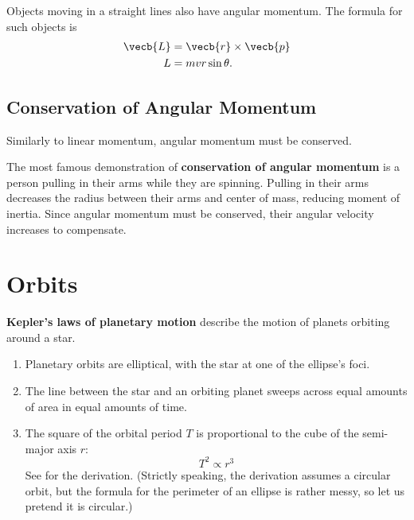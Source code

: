 Objects moving in a straight lines also have angular momentum.
The formula for such objects is
\begin{subequations}
    \begin{align}
        \vecb{L} &= \vecb{r} \times \vecb{p} \\
        L &= m v r \sin\theta. \label{eq:angular-momentum-linear-velocity}
    \end{align}
\end{subequations}

\subsection{Conservation of Angular Momentum}

Similarly to linear momentum, angular momentum must be conserved.

The most famous demonstration of \textbf{conservation of angular momentum}
is a person pulling in their arms while they are spinning.
Pulling in their arms decreases the radius between their arms and
center of mass,
reducing moment of inertia.
Since angular momentum must be conserved,
their angular velocity increases to compensate.

\section{Orbits} \label{sec:orbits}

\textbf{Kepler's laws of planetary motion}
describe the motion of planets orbiting around a star.
\begin{enumerate}
    \item Planetary orbits are elliptical,
        with the star at one of the ellipse's foci.
    \item \label{itm:keplers-2nd-law}
        The line between the star and an orbiting planet
        sweeps across equal amounts of area in equal amounts of time.
    \item The square of the orbital period \(T\) is proportional to
        the cube of the semi-major axis \(r\):
        \begin{equation}
            T^2 \propto r^3
        \end{equation}
        See  for the derivation.
        (Strictly speaking, the derivation assumes a circular orbit,
            but the formula for the perimeter of an ellipse is rather messy,
        so let us pretend it is circular.)
\end{enumerate}

